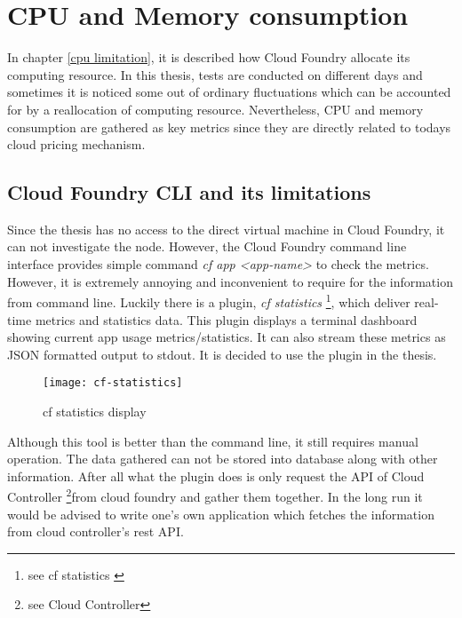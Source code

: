 \section{CPU and Memory consumption}
In chapter \ref{cpu limitation}, it is described how Cloud Foundry allocate its computing resource. In this thesis, tests are conducted on different days and sometimes it is noticed some out of ordinary fluctuations which can be accounted for by a reallocation of computing resource. Nevertheless, CPU and memory consumption are gathered as key metrics since they are directly related to todays cloud pricing mechanism.
\subsection{Cloud Foundry CLI and its limitations}
Since the thesis has no access to the direct virtual machine in Cloud Foundry, it can not investigate the node. However, the Cloud Foundry command line interface provides simple command \textit{cf app <app-name>} to check the metrics. However, it is extremely annoying and inconvenient to require for the information from command line. Luckily there is a plugin, \textit{cf statistics} \footnote{see cf statistics \citep{cfstatistics}}, which deliver real-time metrics and statistics data. This plugin displays a terminal dashboard showing current app usage metrics/statistics. It can also stream these metrics as JSON formatted output to stdout. It is decided to use the plugin in the thesis. \\
\begin{figure}[h]
	\centering
	\texttt{[image: cf-statistics]}
	\caption{cf statistics display}
	\label{cf-statistics}
\end{figure}
Although this tool is better than the command line, it still requires manual operation. The data gathered can not be stored into database along with other information. After all what the plugin does is only request the API of Cloud Controller  \footnote{see Cloud Controller\citep{cloudcontroller}}from cloud foundry and gather them together. In the long run it would be advised to write one's own application which fetches the information from cloud controller's rest API. 
